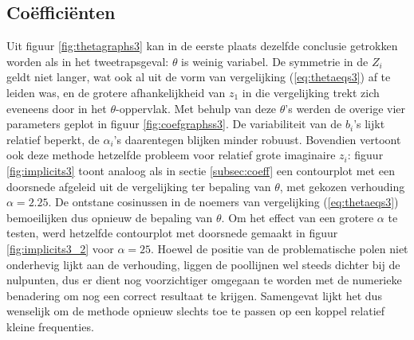 \documentclass[12pt]{article}
\begin{document}
\subsection{Coëfficiënten}
Uit figuur \ref{fig:thetagraphs3} kan in de eerste plaats dezelfde conclusie getrokken worden als in het tweetrapsgeval: \(\theta\) is weinig variabel. De symmetrie in de \(Z_i\) geldt niet langer, wat ook al uit de vorm van vergelijking (\ref{eq:thetaeqs3}) af te leiden was, en de grotere afhankelijkheid van \(z_1\) in die vergelijking trekt zich eveneens door in het \(\theta\)-oppervlak.
Met behulp van deze \(\theta\)'s werden de overige vier parameters geplot in figuur \ref{fig:coefgraphss3}. De variabiliteit van de \(b_i\)'s lijkt relatief beperkt, de \(\alpha_i\)'s daarentegen blijken minder robuust. Bovendien vertoont ook deze methode hetzelfde probleem voor relatief grote imaginaire \(z_i\): figuur \ref{fig:implicits3} toont analoog als in sectie \ref{subsec:coeff} een contourplot met een doorsnede afgeleid uit de vergelijking ter bepaling van \(\theta\), met gekozen verhouding \(\alpha=2.25\). De ontstane cosinussen in de noemers van vergelijking (\ref{eq:thetaeqs3}) bemoeilijken dus opnieuw de bepaling van \(\theta\). Om het effect van een grotere \(\alpha\) te testen, werd hetzelfde contourplot met doorsnede gemaakt in figuur \ref{fig:implicits3_2} voor \(\alpha=25\). Hoewel de positie van de problematische polen niet onderhevig lijkt aan de verhouding, liggen de poollijnen wel steeds dichter bij de nulpunten, dus er dient nog voorzichtiger omgegaan te worden met de numerieke benadering om nog een correct resultaat te krijgen. Samengevat lijkt het dus wenselijk om de methode opnieuw slechts toe te passen op een koppel relatief kleine frequenties.  
\end{document}

